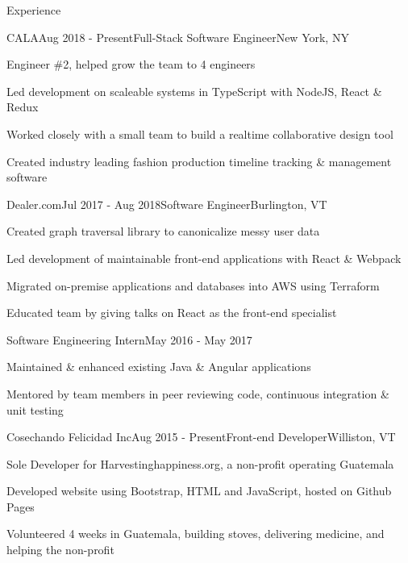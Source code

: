 \documentclass{resume} %
\begin{document}

\begin{rSection}{Experience}


\begin{rSubsection}{CALA}{Aug 2018 - Present}{Full-Stack Software Engineer}{New York, NY}
    \item Engineer \#2, helped grow the team to 4 engineers
    \item Led development on scaleable systems in TypeScript with NodeJS, React \& Redux
    \item Worked closely with a small team to build a realtime collaborative design tool
    \item Created industry leading fashion production timeline tracking \& management software
\end{rSubsection}


\begin{rSubsection}{Dealer.com}{Jul 2017 - Aug 2018}{Software Engineer}{Burlington, VT}
    \item Created graph traversal library to canonicalize messy user data
    \item Led development of maintainable front-end applications with React \& Webpack
    \item Migrated on-premise applications and databases into AWS using Terraform
    \item Educated team by giving talks on React as the front-end specialist
\end{rSubsection}

\begin{sSubsection}{Software Engineering Intern}{May 2016 - May 2017}
    \item Maintained \& enhanced existing Java \& Angular applications
    \item Mentored by team members in peer reviewing code, continuous integration \& unit testing
\end{sSubsection}


\begin{rSubsection}{Cosechando Felicidad Inc}{Aug 2015 - Present}{Front-end Developer}{Williston, VT}
    \item Sole Developer for Harvestinghappiness.org, a non-profit operating Guatemala
    \item Developed website using Bootstrap, HTML and JavaScript, hosted on Github Pages
    \item Volunteered 4 weeks in Guatemala, building stoves, delivering medicine, and helping the non-profit
\end{rSubsection}


\end{rSection}
\end{document}
